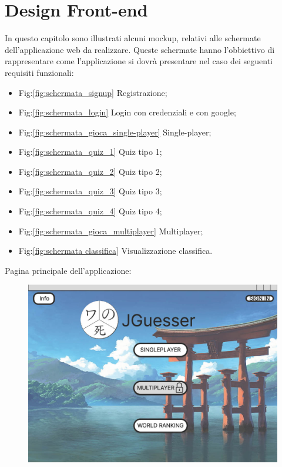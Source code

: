\section{Design Front-end}
In questo capitolo sono illustrati alcuni mockup, relativi alle schermate dell'applicazione web da realizzare. Queste schermate hanno l'obbiettivo di rappresentare come l'applicazione si dovrà presentare nel caso dei seguenti requisiti funzionali:
\begin{itemize}
    \item Fig:\ref{fig:schermata_signup} Registrazione;
    \item Fig:\ref{fig:schermata_login} Login con credenziali e con google;
    \item Fig:\ref{fig:schermata_gioca_single-player} Single-player;
    \item Fig:\ref{fig:schermata_quiz_1} Quiz tipo 1;
    \item Fig:\ref{fig:schermata_quiz_2} Quiz tipo 2;
    \item Fig:\ref{fig:schermata_quiz_3} Quiz tipo 3;
    \item Fig:\ref{fig:schermata_quiz_4} Quiz tipo 4;
    \item Fig:\ref{fig:schermata_gioca_multiplayer} Multiplayer;
    \item Fig:\ref{fig:schermata classifica} Visualizzazione classifica.
\end{itemize}
Pagina principale dell'applicazione:
\begin{figure}[!h]
\centering
\includegraphics[scale=0.35]{images/home_page.jpg}
\end{figure}

